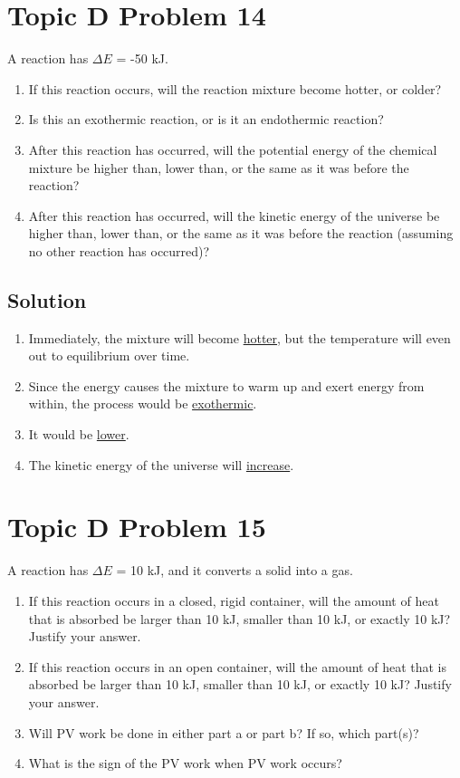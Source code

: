 \documentclass[10pt]{article}
\newcommand{\U}[1]{\underline{#1}}
\begin{document}
    \section{Topic D Problem 14}
        A reaction has $\Delta E$ = -50 kJ.
        \begin{enumerate}[label=\alph*)]
            \item   If this reaction occurs, will the reaction mixture become hotter, or colder?
            \item   Is this an exothermic reaction, or is it an endothermic reaction?
            \item   After this reaction has occurred, will the potential energy of the chemical mixture be higher than, lower than, or the same as it was before the reaction?
            \item   After this reaction has occurred, will the kinetic energy of the universe be higher than, lower than, or the same as it was before the reaction (assuming no other reaction has occurred)?
        \end{enumerate}
        
        \subsection{Solution}
            \begin{enumerate}[label=\alph*)]
                \item   Immediately, the mixture will become \U{hotter}, but the temperature will even out to equilibrium over time.
                \item   Since the energy causes the mixture to warm up and exert energy from within, the process would be \U{exothermic}.
                \item   It would be \U{lower}.
                \item   The kinetic energy of the universe will \U{increase}. 
            \end{enumerate}

    \pagebreak
    \section{Topic D Problem 15}
        A reaction has $\Delta E$ = 10 kJ, and it converts a solid into a gas.
        \begin{enumerate}[label=\alph*)]
            \item If this reaction occurs in a closed, rigid container, will the amount of heat that is absorbed be larger than 10 kJ, smaller than 10 kJ, or exactly 10 kJ? Justify your answer.
            \item If this reaction occurs in an open container, will the amount of heat that is absorbed be larger than 10 kJ, smaller than 10 kJ, or exactly 10 kJ? Justify your answer.
            \item Will PV work be done in either part a or part b? If so, which part(s)?
            \item What is the sign of the PV work when PV work occurs?
        \end{enumerate}
        
\end{document}
